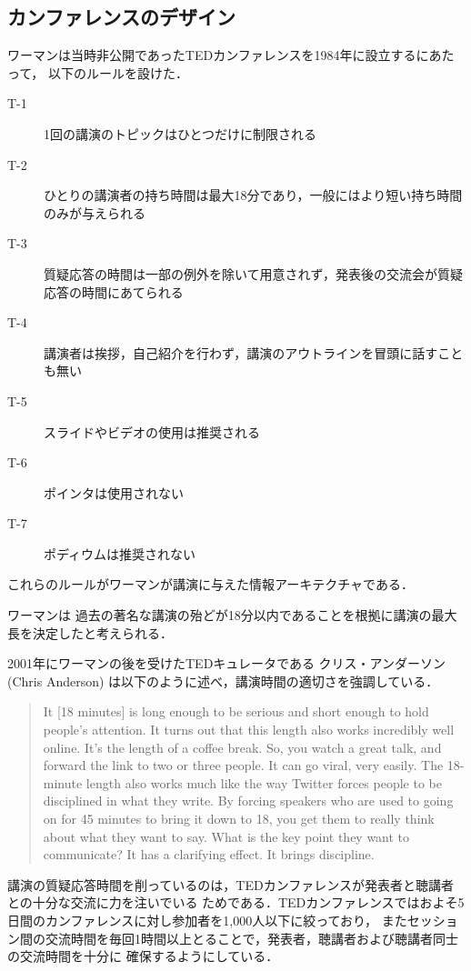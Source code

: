 \documentclass[submit,techreq,jkeyword,noauthor]{ipsj}
\newcommand{\TED}{\textrm{TED}}
\begin{document}
\subsection{カンファレンスのデザイン}

ワーマンは当時非公開であった\TED カンファレンスを1984年に設立するにあたって，
以下のルールを設けた．
\begin{description}
\item[T-1] 1回の講演のトピックはひとつだけに制限される
\item[T-2] ひとりの講演者の持ち時間は最大18分であり，一般にはより短い持ち時間のみが与えられる
\item[T-3] 質疑応答の時間は一部の例外を除いて用意されず，発表後の交流会が質疑応答の時間にあてられる
\item[T-4] 講演者は挨拶，自己紹介を行わず，講演のアウトラインを冒頭に話すことも無い
\item[T-5] スライドやビデオの使用は推奨される
\item[T-6] ポインタは使用されない
\item[T-7] ポディウムは推奨されない
\end{description}
これらのルールがワーマンが講演に与えた情報アーキテクチャである．

ワーマンは%
過去の著名な講演の殆どが18分以内であることを根拠に講演の最大長を決定したと考えられる．\cite{cg}

2001年にワーマンの後を受けた\TED キュレータである
クリス・アンダーソン (Chris Anderson) は以下のように述べ，講演時間の適切さを強調している．\cite{cgweb}
\begin{quote}
It [18 minutes] is long enough to be serious and short enough to hold people's attention.
It turns out that this length also works incredibly well online. It's the length of a 
coffee break. So, you watch a great talk, and forward the link to two or three people. 
It can go viral, very easily. The 18-minute length also works much like the way Twitter 
forces people to be disciplined in what they write. By forcing speakers who are used to 
going on for 45 minutes to bring it down to 18, you get them to really think about what 
they want to say. What is the key point they want to communicate? It has a clarifying 
effect. It brings discipline.
\end{quote}

講演の質疑応答時間を削っているのは，\TED カンファレンスが発表者と聴講者との十分な交流に力を注いでいる
ためである．\TED カンファレンスではおよそ5日間のカンファレンスに対し参加者を1,000人以下に絞っており，
またセッション間の交流時間を毎回1時間以上とることで，発表者，聴講者および聴講者同士の交流時間を十分に
確保するようにしている．
\end{document}
